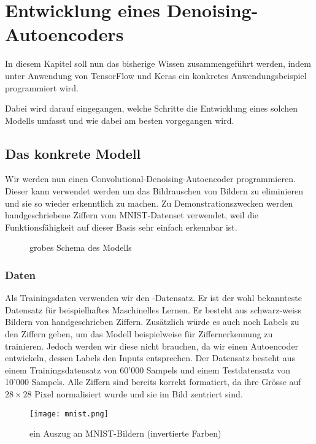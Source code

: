 
\chapter{Entwicklung eines Denoising-Autoencoders}
In diesem Kapitel soll nun das bisherige Wissen zusammengeführt werden, indem
unter Anwendung von TensorFlow und Keras ein konkretes
Anwendungsbeispiel programmiert wird.

 Dabei wird darauf eingegangen, welche Schritte die
Entwicklung eines solchen Modells umfasst und wie dabei am besten vorgegangen
wird.

\section{Das konkrete Modell}
Wir werden nun einen Convolutional-Denoising-Autoencoder programmieren.
Dieser kann verwendet werden um das Bildrauschen von Bildern zu eliminieren und
sie so wieder erkenntlich zu machen.
Zu Demonstrationszwecken werden handgeschriebene Ziffern vom MNIST-Datenset
verwendet, weil die Funktionsfähigkeit auf dieser Basis sehr einfach erkennbar ist.

\begin{figure}
  \caption{grobes Schema des Modells}
\end{figure}

\para{}
\subsection{Daten}
Als Trainingsdaten verwenden wir den -Datensatz. Er ist der wohl
bekannteste Datensatz für beispielhaftes Maschinelles Lernen.
Er besteht aus schwarz-weiss Bildern von handgeschrieben Ziffern.
Zusätzlich würde es auch noch Labels zu den Ziffern geben, um das Modell beispielweise
für Ziffernerkennung zu trainieren. Jedoch werden
wir diese nicht brauchen, da wir einen Autoencoder entwickeln, dessen Labels den
Inputs entsprechen.
\para{}
Der Datensatz besteht aus einem Trainingsdatensatz von 60'000 Sampels und einem Testdatensatz
von 10'000 Sampels. Alle Ziffern sind bereits korrekt formatiert, da ihre Grösse
auf $28 \times 28$ Pixel normalisiert wurde und sie im Bild zentriert sind.

\begin{figure}
  \centering
  \texttt{[image: mnist.png]}
  \caption{ein Auszug an MNIST-Bildern (invertierte Farben) \cite{res:mnist_images}}
\end{figure}

